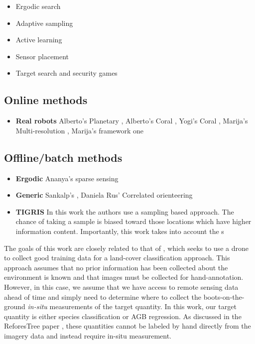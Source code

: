 \begin{itemize}
    \item Ergodic search
    \item Adaptive sampling
    \item Active learning 
    \item Sensor placement
    \item Target search and security games
\end{itemize}

\subsection{Online methods}
\begin{itemize}
    \item \textbf{Real robots} Alberto's Planetary \cite{Kodgule2019Non-myopicMeasurements}, Alberto's Coral \cite{Candela2021}, Yogi's Coral \cite{Jamieson2020ActiveEnvironments}, Marija's Multi-resolution \cite{Stache2021AdaptiveSegmentation}, Marija's framework one \cite{Popovic2020}
\end{itemize}


\subsection{Offline/batch methods}
\begin{itemize}
    \item \textbf{Ergodic} Ananya's sparse sensing \cite{Rao}
    \item \textbf{Generic} Sankalp's \cite{Arora2017RandomizedConstraints}, Daniela Rus' Correlated orienteering \cite{Yu2016CorrelatedTasks}
    \item \textbf{TIGRIS} \cite{Moon2022TIGRIS:Planning}
    In this work the authors use a sampling based approach. The chance of taking a sample is biased toward those locations which have higher information content. Importantly, this work takes into account the s
\end{itemize}

The goals of this work are closely related to that of \cite{Ruckin2022}, which seeks to use a drone to collect good training data for a land-cover classification approach. This approach assumes that no prior information has been collected about the environment is known and that images must be collected for hand-annotation. However, in this case, we assume that we have access to remote sensing data ahead of time and simply need to determine where to collect the boots-on-the-ground \textit{in-situ} measurements of the target quantity. In this work, our target quantity is either species classification or AGB regression. As discussed in the ReforesTree paper \cite{reforestree}, these quantities cannot be labeled by hand directly from the imagery data and instead require in-situ measurement. 

